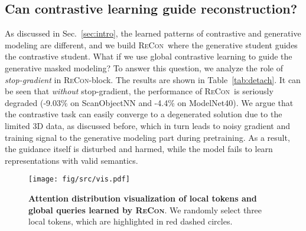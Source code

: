 \documentclass{article}
\theoremstyle{plain}
\theoremstyle{definition}
\theoremstyle{remark}
\def\recon{{\scshape ReCon}}
\begin{document}
\begin{table}[!t]
\caption{\textbf{Study of the \textit{stop-gradient} operation in \recon-block}. Overall accuracy (\%) without voting is reported.} \label{tab:detach}
\begin{center}
\end{center}
\vspace{-15pt}
\end{table}

 \vspace{-4pt}
\subsection{Can contrastive learning guide reconstruction?}
\vspace{-3pt}
As discussed in Sec.~\ref{sec:intro}, the learned patterns of contrastive and generative modeling are different, and we build \recon\ where the generative student guides the contrastive student.
What if we use global contrastive learning to guide the generative masked modeling?
To answer this question, we analyze the role of \textit{stop-gradient} in \recon-block.
The results are shown in Table~\ref{tab:detach}. 
It can be seen that \textit{without} stop-gradient, the performance of \recon~is seriously degraded (-9.03\% on ScanObjectNN and -4.4\% on ModelNet40).
We argue that the contrastive task can easily converge to a degenerated solution due to the limited 3D data, as discussed before, which in turn leads to noisy gradient and training signal to the generative modeling part during pretraining.
As a result, the guidance itself is disturbed and harmed, while
the model fails to learn representations with valid semantics.

\begin{figure}[t!]
    \begin{center}
    \texttt{[image: fig/src/vis.pdf]}
    \vspace{-20pt}
    \caption{\textbf{Attention distribution visualization of local tokens and global queries learned by \recon}. We randomly select three local tokens, which are highlighted in red dashed circles.}\label{fig:atten_vis}
    \end{center}
    \vspace{-25pt}
\end{figure} \vspace{-5pt}
\end{document}
